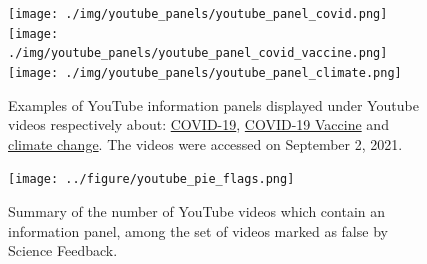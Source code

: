 \documentclass{article}
\begin{document}
\begin{figure}[h]
	\centering
		\texttt{[image: ./img/youtube\_panels/youtube\_panel\_covid.png]} 
		\texttt{[image: ./img/youtube\_panels/youtube\_panel\_covid\_vaccine.png]} 
		\texttt{[image: ./img/youtube\_panels/youtube\_panel\_climate.png]}
	\caption{Examples of YouTube information panels displayed under Youtube videos respectively about: \href{https://www.youtube.com/watch?v=O1cFVdC2rZQ}{COVID-19}, \href{https://www.youtube.com/watch?v=v0-6JTr2Ifo}{COVID-19 Vaccine} and \href{https://www.youtube.com/watch?v=4U8kgiiVj5Q}{climate change}. The videos were accessed on September 2, 2021.}
	\label{youtube_panel_screenshots}
\end{figure}


\begin{figure}[h]
	\centering
		\texttt{[image: ../figure/youtube\_pie\_flags.png]}
		\caption{Summary of the number of YouTube videos which contain an information panel, among the set of videos marked as false by Science Feedback.}
\label{youtube_panel_proportions}
\end{figure}
\end{document}
